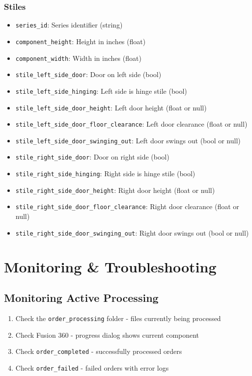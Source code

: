 \documentclass[11pt,letterpaper]{article}
\begin{document}
\subsubsection{Stiles}

\begin{itemize}[noitemsep]
    \item \texttt{series\_id}: Series identifier (string)
    \item \texttt{component\_height}: Height in inches (float)
    \item \texttt{component\_width}: Width in inches (float)
    \item \texttt{stile\_left\_side\_door}: Door on left side (bool)
    \item \texttt{stile\_left\_side\_hinging}: Left side is hinge stile (bool)
    \item \texttt{stile\_left\_side\_door\_height}: Left door height (float or null)
    \item \texttt{stile\_left\_side\_door\_floor\_clearance}: Left door clearance (float or null)
    \item \texttt{stile\_left\_side\_door\_swinging\_out}: Left door swings out (bool or null)
    \item \texttt{stile\_right\_side\_door}: Door on right side (bool)
    \item \texttt{stile\_right\_side\_hinging}: Right side is hinge stile (bool)
    \item \texttt{stile\_right\_side\_door\_height}: Right door height (float or null)
    \item \texttt{stile\_right\_side\_door\_floor\_clearance}: Right door clearance (float or null)
    \item \texttt{stile\_right\_side\_door\_swinging\_out}: Right door swings out (bool or null)
\end{itemize}

\section{Monitoring \& Troubleshooting}

\subsection{Monitoring Active Processing}

\begin{enumerate}
    \item Check the \texttt{order\_processing} folder - files currently being processed
    \item Check Fusion 360 - progress dialog shows current component
    \item Check \texttt{order\_completed} - successfully processed orders
    \item Check \texttt{order\_failed} - failed orders with error logs
\end{enumerate}
\end{document}
